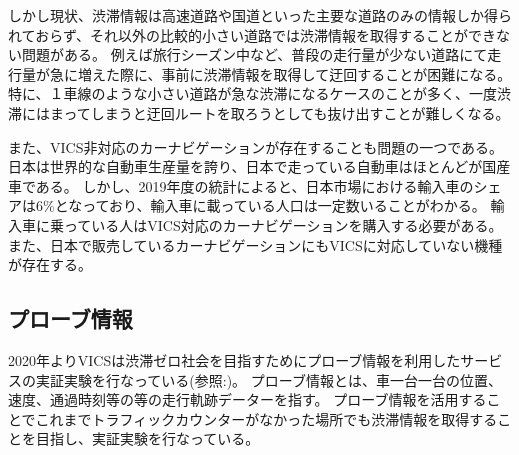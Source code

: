 しかし現状、渋滞情報は高速道路や国道といった主要な道路のみの情報しか得られておらず、それ以外の比較的小さい道路では渋滞情報を取得することができない問題がある。
例えば旅行シーズン中など、普段の走行量が少ない道路にて走行量が急に増えた際に、事前に渋滞情報を取得して迂回することが困難になる。
特に、１車線のような小さい道路が急な渋滞になるケースのことが多く、一度渋滞にはまってしまうと迂回ルートを取ろうとしても抜け出すことが難しくなる。

また、VICS非対応のカーナビゲーションが存在することも問題の一つである。
日本は世界的な自動車生産量を誇り、日本で走っている自動車はほとんどが国産車である。
しかし、2019年度の統計によると、日本市場における輸入車のシェアは6\%となっており、輸入車に載っている人口は一定数いることがわかる。
輸入車に乗っている人はVICS対応のカーナビゲーションを購入する必要がある。
また、日本で販売しているカーナビゲーションにもVICSに対応していない機種が存在する。

\subsection{プローブ情報}
2020年よりVICSは渋滞ゼロ社会を目指すためにプローブ情報を利用したサービスの実証実験を行なっている(参照:)。
プローブ情報とは、車一台一台の位置、速度、通過時刻等の等の走行軌跡データーを指す。
プローブ情報を活用することでこれまでトラフィックカウンターがなかった場所でも渋滞情報を取得することを目指し、実証実験を行なっている。

